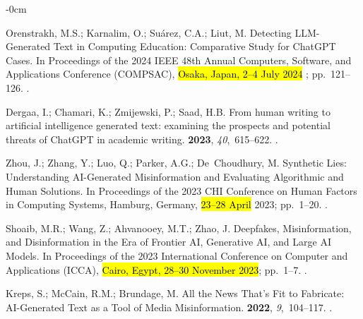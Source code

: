 \documentclass[electronics,article,accept,pdftex,moreauthors,electronics]{Definitions/mdpi}
\begin{document}
\begin{adjustwidth}{-\extralength}{0cm}
\begin{thebibliography}{999}
Orenstrakh, M.S.; Karnalim, O.; Suárez, C.A.; Liut, M.
\newblock Detecting {LLM}-{Generated} {Text} in {Computing} {Education}:
  {Comparative} {Study} for {ChatGPT} {Cases}.
\newblock In Proceedings of the 2024 IEEE 48th Annual Computers, Software, and Applications Conference (COMPSAC), \hl{Osaka, Japan, 2--4 July 2024}%
; pp.~121--126.
.

Dergaa, I.; Chamari, K.; Zmijewski, P.; Saad, H.B.
\newblock From human writing to artificial intelligence generated text:
  examining the prospects and potential threats of {ChatGPT} in academic
  writing.
 {\bf 2023}, {\em 40},~615--622.
.

Zhou, J.; Zhang, Y.; Luo, Q.; Parker, A.G.; De~Choudhury, M.
\newblock Synthetic {Lies}: {Understanding} {AI}-{Generated} {Misinformation}
  and {Evaluating} {Algorithmic} and {Human} {Solutions}.
\newblock In Proceedings of the  2023 {CHI} {Conference} on
  {Human} {Factors} in {Computing} {Systems}, Hamburg, Germany, \hl{23--28 April} %
 2023; pp.~1--20.
.

Shoaib, M.R.; Wang, Z.; Ahvanooey, M.T.; Zhao, J.
\newblock Deepfakes, {Misinformation}, and {Disinformation} in the {Era} of
  {Frontier} {AI}, {Generative} {AI}, and {Large} {AI} {Models}.
\newblock In Proceedings of the 2023 {International} {Conference} on {Computer}
  and {Applications} ({ICCA}),  \hl{Cairo, Egypt,  28--30 November 2023}; pp.~1--7.
.

Kreps, S.; McCain, R.M.; Brundage, M.
\newblock All the {News} {That}’s {Fit} to {Fabricate}: {AI}-{Generated}
  {Text} as a {Tool} of {Media} {Misinformation}.
 {\bf 2022}, {\em 9},~104--117.
.


\end{thebibliography}
\end{adjustwidth}
\end{document}
